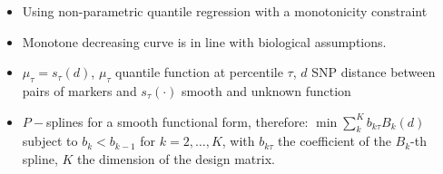\documentclass[a0paper,portrait]{baposter}
\begin{document}
\begin{poster}
 {%
\begin{itemize}[leftmargin=*]
	\item Using non-parametric quantile 
	regression with a monotonicity constraint \citep{Muggeo2013,BollaertsEtAl2006StatMod}
	\item Monotone decreasing curve is in line with biological assumptions.
	\item $\mu_{\tau}=s_{\tau}(d)$, $\mu_\tau$ quantile function at 
	percentile $\tau$, $d$ SNP distance between pairs of markers and 
	$s_{\tau}(\cdot)$ smooth and unknown function
	\item  $P-$splines for a smooth functional form, therefore: \newline 
$\min\sum_k^K b_{k\tau} B_k(d)$ subject to $b_k<b_{k-1}$ for $k=2,\ldots,K$, with $b_{k\tau}$
	the coefficient of the $B_k$-th spline, $K$ the dimension of the design matrix.
	\newline $\mbox{}$
%	
%
\end{itemize}
}



\end{poster}
\end{document}
